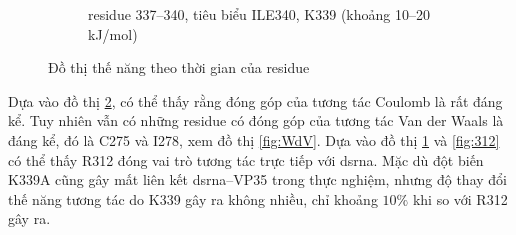 \documentclass[12pt,a4paper,reqno, oneside]{book}
\begin{document}
\begin{figure}[h!]
\begin{subfigure}{0.5\textwidth}
\caption{\gls{residue} 337--340, tiêu biểu  ILE340, K339 (khoảng 10--20 kJ/mol)}
\label{fig:339}
\end{subfigure}
\caption{Đồ thị thế năng theo thời gian của \gls{residue}}
\label{fig:Coulomb}
\end{figure}
Dựa vào đồ thị \ref{fig:Coulomb}, có thể thấy rằng đóng góp của tương tác Coulomb là rất đáng kể. Tuy nhiên vẫn có những \gls{residue} có đóng góp của tương tác Van der Waals là đáng kể, đó là C275 và I278, xem đồ thị \ref{fig:WdV}.
Dựa vào đồ thị \ref{fig:339} và \ref{fig:312} có thể thấy R312 đóng vai trò tương tác trực tiếp với \gls{dsrna}. Mặc dù đột biến \gls{K339A} cũng gây mất liên kết \gls{dsrna}--VP35 trong thực nghiệm, nhưng độ thay đổi thế năng tương tác do K339 gây ra không nhiều, chỉ khoảng $10\%$ khi so với R312 gây ra.
\clearpage
\end{document}
